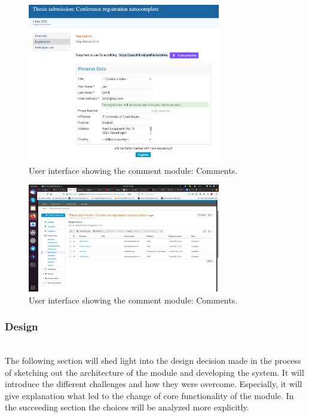 \begin{figure}[ht!]
    \centering
    \includegraphics[width=0.75\textwidth]{prototype/graphs/poc-autocomplete-conference-registration.png}
    \caption{User interface showing the comment module: Comments.}
    \label{fig:poc-autocomplete-conference-registration}
\end{figure}

\begin{figure}[ht!]
    \centering
    \includegraphics[width=0.75\textwidth]{prototype/graphs/poc-autocomplete-conference-registration-submitted.png}
    \caption{User interface showing the comment module: Comments.}
    \label{fig:poc-autocomplete-conference-registration-submitted}
\end{figure}

\subsubsection{Design}\mbox{}\\

The following section will shed light into the design decision made in the process of sketching out the architecture of the module and developing the system. It will introduce the different challenges and how they were overcome. Especially, it will give explanation what led to the change of core functionality of the module. In the succeeding section the choices will be analyzed more explicitly.

